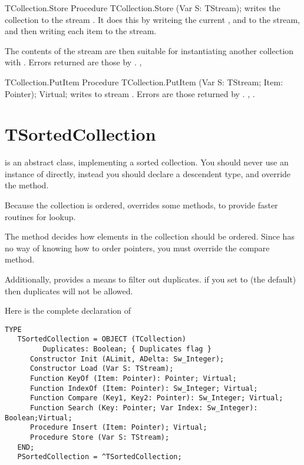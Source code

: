\begin{procedure}{TCollection.Store}
\Declaration
Procedure TCollection.Store (Var S: TStream);
\Description
{} writes the collection to the stream . It does
this by writeing the current ,  and 
to the stream, and then writing each item to the stream.

The contents of the stream are then suitable for instantiating another
collection with .
\Errors
Errors returned are those by .
\SeeAlso
{}, 
\end{procedure}


\begin{procedure}{TCollection.PutItem}
\Declaration
Procedure TCollection.PutItem (Var S: TStream; Item: Pointer); Virtual;
\Description
{} writes  to stream . 
\Errors
Errors are those returned by .
\SeeAlso
{}, .
\end{procedure}


\section{TSortedCollection}
\label{se:TSortedCollection}

 is an abstract class, implementing a sorted
collection. You should never use an instance of 
directly, instead you should declare a descendent type, and override the
 method.

Because the collection is ordered,  overrides some
 methods, to provide faster routines for lookup.

The  method decides how elements 
in the collection should be ordered. Since  has no way
of knowing how to order pointers, you must override the compare method.

Additionally,  provides a means to filter out duplicates.
if you set  to  (the default) then duplicates
will not be allowed.

Here is the complete declaration of 

\begin{verbatim}
TYPE
   TSortedCollection = OBJECT (TCollection)
         Duplicates: Boolean; { Duplicates flag }
      Constructor Init (ALimit, ADelta: Sw_Integer);
      Constructor Load (Var S: TStream);
      Function KeyOf (Item: Pointer): Pointer; Virtual;
      Function IndexOf (Item: Pointer): Sw_Integer; Virtual;
      Function Compare (Key1, Key2: Pointer): Sw_Integer; Virtual;
      Function Search (Key: Pointer; Var Index: Sw_Integer): Boolean;Virtual;
      Procedure Insert (Item: Pointer); Virtual;
      Procedure Store (Var S: TStream);
   END;
   PSortedCollection = ^TSortedCollection;
\end{verbatim}

